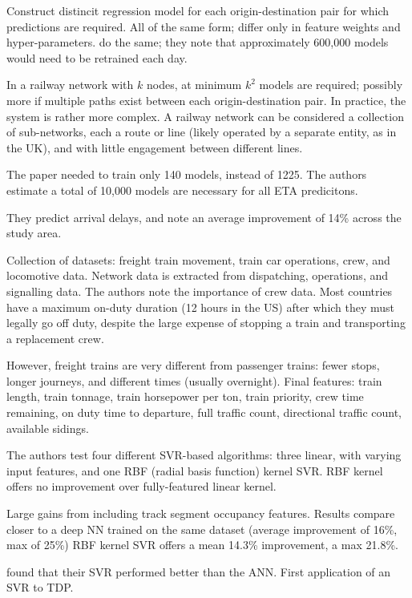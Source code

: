 \documentclass{article}
\begin{document}
Construct distincit regression model for each origin-destination pair for which predictions are required. All of the same form; differ only in feature weights and hyper-parameters. \cite{oneto_et_al_2016} do the same; they note that approximately 600,000 models would need to be retrained each day.

In a railway network with $k$ nodes, at minimum $k^2$ models are required; possibly more if multiple paths exist between each origin-destination pair. In practice, the system is rather more complex. A railway network can be considered a collection of sub-networks, each a route or line (likely operated by a separate entity, as in the UK), and with little engagement between different lines.

The paper needed to train only 140 models, instead of 1225. The authors estimate a total of 10,000 models are necessary for all ETA predicitons. 

They predict arrival delays, and note an average improvement of 14\% across the study area. 

Collection of datasets: freight train movement, train car operations, crew, and locomotive data. Network data is extracted from dispatching, operations, and signalling data. 
The authors note the importance of crew data. Most countries have a maximum on-duty duration (12 hours in the US) after which they must legally go off duty, despite the large expense of stopping a train and transporting a replacement crew. 

However, freight trains are very different from passenger trains: fewer stops, longer journeys, and different times (usually overnight). Final features: train length, train tonnage, train horsepower per ton, train priority, crew time remaining, on duty time to departure, full traffic count, directional traffic count, available sidings. 

The authors test four different SVR-based algorithms: three linear, with varying input features, and one RBF (radial basis function) kernel SVR. RBF kernel offers no improvement over fully-featured linear kernel. 

Large gains from including track segment occupancy features. Results compare closer to a deep NN trained on the same dataset (average improvement of 16\%, max of 25\%)
RBF kernel SVR offers a mean 14.3\% improvement, a max 21.8\%.

\cite{markovic_et_al_2015} found that their SVR performed better than the ANN. First application of an SVR to TDP. 
\end{document}
